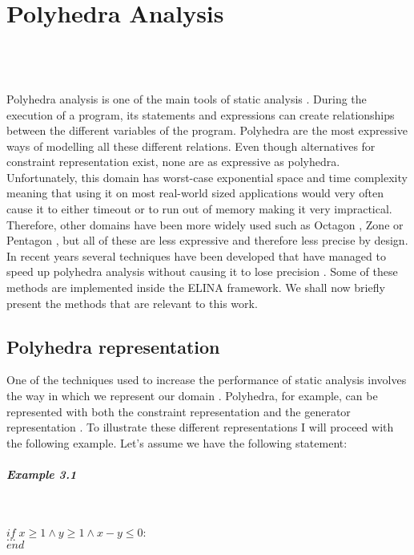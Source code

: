 
\chapter{Polyhedra Analysis}
\mbox{}\\
\mbox{}\\
\mbox{}\\
Polyhedra analysis is one of the main tools of static analysis \cite{cousot1977abstract}. During the execution of a program, its statements and expressions can create relationships between the different variables of the program. Polyhedra are the most expressive ways of modelling all these different relations. Even though alternatives for constraint representation exist, none are as expressive as polyhedra. Unfortunately, this domain has worst-case exponential space and time complexity meaning that using it on most real-world sized applications would very often cause it to either timeout or to run out of memory making it very impractical. Therefore, other domains have been more widely used such as Octagon \cite{mine2006octagon}, Zone \cite{mine2001new} or Pentagon \cite{logozzo2010pentagons}, but all of these are less expressive and therefore less precise by design. In recent years several techniques have been developed that have managed to speed up polyhedra analysis without causing it to lose precision \cite{gange2016exploiting,jourdan2017sparsity,marechal2017efficient}. Some of these methods are implemented inside the ELINA framework. We shall now briefly present the methods that are relevant to this work.
\section{Polyhedra representation}
One of the techniques used to increase the performance of static analysis involves the way in which we represent our domain \cite{singh2015making}. Polyhedra, for example, can be represented with both the constraint representation and the generator representation \cite{motzkin1953double}. To illustrate these different representations I will proceed with the following example. Let's assume we have the following statement:
\paragraph{Example 3.1}\mbox{}\\
\begin{center}
	$if \; x\geq1\wedge y \geq 1 \wedge x - y \leq 0: $\\ 
	$...\;\;\;\;\;$\\
	$end \qquad\qquad\qquad\qquad\qquad\qquad$
\end{center}

